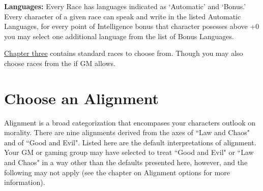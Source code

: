 \textbf{Languages: }Every Race has languages indicated as `Automatic' and `Bonus.'  Every character of a given race can speak and write in the listed Automatic Languages, for every point of Intelligence bonus that character posesses above +0 you may select one additional language from the list of Bonus Languages.

\hyperlink{chapter.3}{Chapter three} contains standard races to choose from. Though you may also choose races from the  if GM allows.

\section{Choose an Alignment}

Alignment is a broad categorization that encompases your characters outlook on morality.  There are nine alignments derived from the axes of ``Law and Chaos" and of ``Good and Evil". Listed here are the default interpretations of alignment. Your GM or gaming group may have selected to treat ``Good and Evil" or ``Law and Chaos" in a way other than the defaults presented here, however, and the following may not apply (see the chapter on Alignment options for more information).
\vspace*{10pt}
